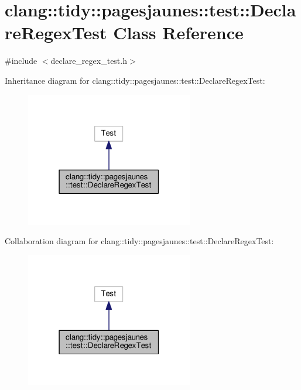 \hypertarget{classclang_1_1tidy_1_1pagesjaunes_1_1test_1_1_declare_regex_test}{}\section{clang\+:\+:tidy\+:\+:pagesjaunes\+:\+:test\+:\+:Declare\+Regex\+Test Class Reference}
\label{classclang_1_1tidy_1_1pagesjaunes_1_1test_1_1_declare_regex_test}


{\ttfamily \#include $<$declare\+\_\+regex\+\_\+test.\+h$>$}



Inheritance diagram for clang\+:\+:tidy\+:\+:pagesjaunes\+:\+:test\+:\+:Declare\+Regex\+Test\+:
\nopagebreak
\begin{figure}[H]
\begin{center}
\leavevmode
\includegraphics[width=207pt]{classclang_1_1tidy_1_1pagesjaunes_1_1test_1_1_declare_regex_test__inherit__graph}
\end{center}
\end{figure}


Collaboration diagram for clang\+:\+:tidy\+:\+:pagesjaunes\+:\+:test\+:\+:Declare\+Regex\+Test\+:
\nopagebreak
\begin{figure}[H]
\begin{center}
\leavevmode
\includegraphics[width=207pt]{classclang_1_1tidy_1_1pagesjaunes_1_1test_1_1_declare_regex_test__coll__graph}
\end{center}
\end{figure}
